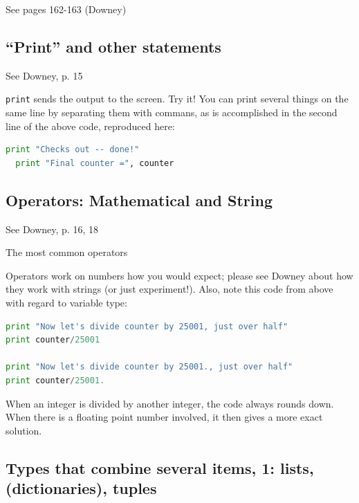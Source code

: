 \documentclass[a4paper,10pt]{scrartcl}
\begin{document}
\begin{framed}
 See pages 162-163 (Downey)
\end{framed}

\subsection{``Print'' and other statements}

\begin{framed}
See Downey, p. 15
\end{framed}

\lstinline{print} sends the output to the screen. Try it! You can print several things on the same line by separating them with commans, as is accomplished in the second line of the above code, reproduced here:
\begin{lstlisting}[belowskip=-1.6\baselineskip, language=python]
  print "Checks out -- done!"
  print "Final counter =", counter
\end{lstlisting}
  
\subsection{Operators: Mathematical and String}
\label{s:math}

\begin{framed}
See Downey, p. 16, 18
\end{framed}

The most common operators 

Operators work on numbers how you would expect; please see Downey about how they work with strings (or just experiment!). Also, note this code from above with regard to variable type:
\begin{lstlisting}[belowskip=-1.6\baselineskip, language=python]
print "Now let's divide counter by 25001, just over half"
print counter/25001

print "Now let's divide counter by 25001., just over half"
print counter/25001.
\end{lstlisting}
When an integer is divided by another integer, the code always rounds down. When there is a floating point number involved, it then gives a more exact solution.

\subsection{Types that combine several items, 1: lists, (dictionaries), tuples}
\label{s:containerTypes}
\end{document}
